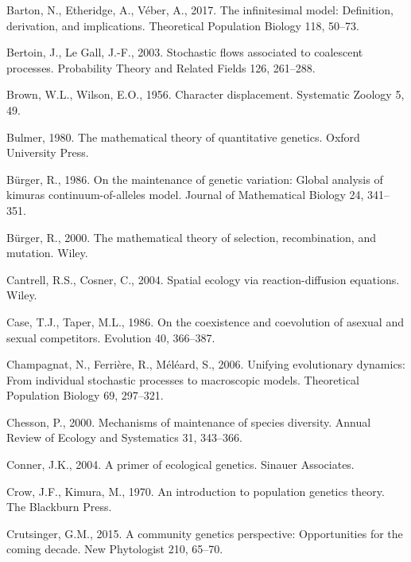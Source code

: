 \documentclass[]{elsarticle} %
\begin{document}
\leavevmode\hypertarget{ref-Barton2017}{}%
Barton, N., Etheridge, A., Véber, A., 2017. The infinitesimal model:
Definition, derivation, and implications. Theoretical Population Biology
118, 50--73.

\leavevmode\hypertarget{ref-Bertoin2003}{}%
Bertoin, J., Le Gall, J.-F., 2003. Stochastic flows associated to
coalescent processes. Probability Theory and Related Fields 126,
261--288.

\leavevmode\hypertarget{ref-Brown1956}{}%
Brown, W.L., Wilson, E.O., 1956. Character displacement. Systematic
Zoology 5, 49.

\leavevmode\hypertarget{ref-bulmer1980}{}%
Bulmer, 1980. The mathematical theory of quantitative genetics. Oxford
University Press.

\leavevmode\hypertarget{ref-Brger1986}{}%
Bürger, R., 1986. On the maintenance of genetic variation: Global
analysis of kimuras continuum-of-alleles model. Journal of Mathematical
Biology 24, 341--351.

\leavevmode\hypertarget{ref-9780471986539}{}%
Bürger, R., 2000. The mathematical theory of selection, recombination,
and mutation. Wiley.

\leavevmode\hypertarget{ref-Cantrell2004}{}%
Cantrell, R.S., Cosner, C., 2004. Spatial ecology via reaction-diffusion
equations. Wiley.

\leavevmode\hypertarget{ref-Case1986}{}%
Case, T.J., Taper, M.L., 1986. On the coexistence and coevolution of
asexual and sexual competitors. Evolution 40, 366--387.

\leavevmode\hypertarget{ref-Champagnat2006}{}%
Champagnat, N., Ferrière, R., Méléard, S., 2006. Unifying evolutionary
dynamics: From individual stochastic processes to macroscopic models.
Theoretical Population Biology 69, 297--321.

\leavevmode\hypertarget{ref-Chesson2000}{}%
Chesson, P., 2000. Mechanisms of maintenance of species diversity.
Annual Review of Ecology and Systematics 31, 343--366.

\leavevmode\hypertarget{ref-jeffreyconner2004}{}%
Conner, J.K., 2004. A primer of ecological genetics. Sinauer Associates.

\leavevmode\hypertarget{ref-9781932846126}{}%
Crow, J.F., Kimura, M., 1970. An introduction to population genetics
theory. The Blackburn Press.

\leavevmode\hypertarget{ref-Crutsinger2015}{}%
Crutsinger, G.M., 2015. A community genetics perspective: Opportunities
for the coming decade. New Phytologist 210, 65--70.
\end{document}
